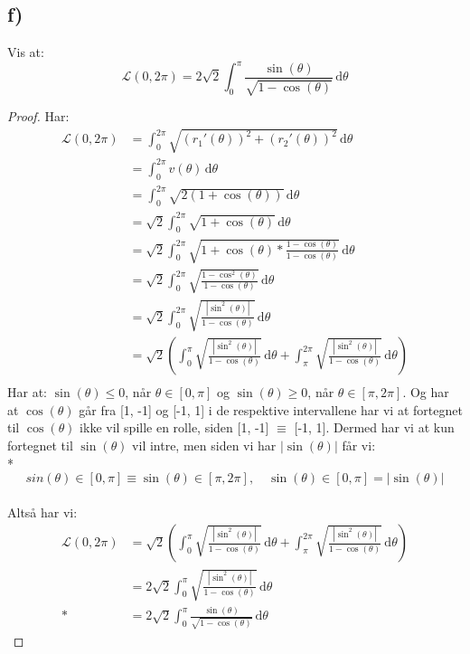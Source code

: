 \documentclass[a4paper, norsk, twoside, 10pt]{article}
\begin{document}
  \subsection*{f)}
  Vis at: \[\mathcal{L}(0, 2\pi) = 2\sqrt{2} \int_0^{\pi}\!\frac{\sin(\theta)}{\sqrt{1-\cos(\theta)}} \,\mathrm{d}\theta \]
  \begin{proof}
    Har: \[\begin{split}
        \mathcal{L}(0, 2\pi) &= \int_0^{2\pi}\!\sqrt{(r_{1}'(\theta))^{2} + (r_{2}'(\theta))^{2}}\,\mathrm{d}\theta \\
        &= \int_0^{2\pi}\!v(\theta)\,\mathrm{d}\theta \\
        &= \int_0^{2\pi}\!\sqrt{2(1+ \cos(\theta))}\,\mathrm{d}\theta\\
        &= \sqrt{2} \int_0^{2\pi}\!\sqrt{1+ \cos(\theta)}\,\mathrm{d}\theta \\
        &= \sqrt{2} \int_0^{2\pi}\!\sqrt{1+ \cos(\theta) * \frac{1-\cos(\theta)}{1-\cos(\theta)}}\,\mathrm{d}\theta \\
        &= \sqrt{2} \int_0^{2\pi}\!\sqrt{\frac{1 - \cos^{2}(\theta)}{1- \cos(\theta)}}\,\mathrm{d}\theta\\
        &= \sqrt{2} \int_0^{2\pi}\!\sqrt{\frac{|\sin^{2}(\theta)|}{1- \cos(\theta)}}\,\mathrm{d}\theta\\
          &=\sqrt{2} \left( \int_0^{\pi}\!\sqrt{\frac{|\sin^{2}(\theta)|}{1- \cos(\theta)}}\,\mathrm{d}\theta + \int_\pi^{2\pi}\!\sqrt{\frac{|\sin^{2}(\theta)|}{1- \cos(\theta)}}\,\mathrm{d}\theta \right)\\
      \end{split}\]
    Har at: $\sin(\theta) \leq 0$, når $\theta \in [0, \pi]$ og $\sin(\theta) \geq 0$, når $\theta \in [\pi, 2\pi]$. Og har at $\cos(\theta)$ går fra [1, -1] og [-1, 1] i de respektive intervallene har vi at fortegnet til $\cos(\theta)$ ikke vil spille en rolle, siden [1, -1] $\equiv$ [-1, 1]. Dermed har vi at kun fortegnet til $\sin(\theta)$ vil intre, men siden vi har $|\sin(\theta)|$ får vi:\\*
    \[sin(\theta) \in [0, \pi] \equiv \sin(\theta) \in [\pi, 2\pi],\quad \sin(\theta)\in[0, \pi] = |\sin(\theta)|\]\\
    Altså har vi: \[ \begin{split} \mathcal{L}(0, 2\pi) &= \sqrt{2} \left( \int_0^{\pi}\!\sqrt{\frac{|\sin^{2}(\theta)|}{1- \cos(\theta)}}\,\mathrm{d}\theta + \int_\pi^{2\pi}\!\sqrt{\frac{|\sin^{2}(\theta)|}{1- \cos(\theta)}}\,\mathrm{d}\theta \right) \\
      &= 2\sqrt{2}\int_0^{\pi}\!\sqrt{\frac{|\sin^{2}(\theta)|}{1- \cos(\theta)}}\,\mathrm{d}\theta \\*
      &= 2\sqrt{2}\int_0^{\pi}\!\frac{\sin(\theta)}{\sqrt{1- \cos(\theta)}}\,\mathrm{d}\theta
\end{split}\]
  \end{proof}
\end{document}
